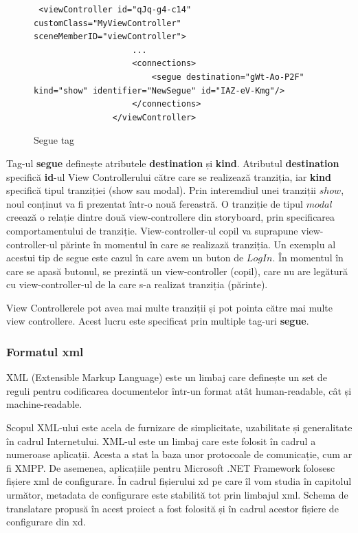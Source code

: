 \begin{figure}[!htbp]
\lstset{language=XML}
\begin{lstlisting}
 <viewController id="qJq-g4-c14" customClass="MyViewController" sceneMemberID="viewController">
                    ...
                    <connections>
                        <segue destination="gWt-Ao-P2F" kind="show" identifier="NewSegue" id="IAZ-eV-Kmg"/>
                    </connections>
                </viewController>
\end{lstlisting}
\caption{Segue tag}\label{fig:segueXML}
\end{figure}

Tag-ul \textbf{segue} definește atributele \textbf{destination} și \textbf{kind}. Atributul \textbf{destination} specifică \textbf{id}-ul View Controllerului către care se realizează tranziția, iar \textbf{kind} specifică tipul tranziției (show sau modal). Prin interemdiul unei tranziții $show$, noul conținut va fi prezentat într-o nouă fereastră. O tranziție de tipul $modal$ creează o relație dintre două view-controllere din storyboard, prin specificarea comportamentului de tranziție. View-controller-ul copil va suprapune view-controller-ul părinte în momentul în care se realizază tranziția. Un exemplu al acestui tip de segue este cazul în care avem un buton de $Log In$. În momentul în care se apasă butonul, se prezintă un view-controller (copil), care nu are legătură cu view-controller-ul de la care s-a realizat tranziția (părinte). 

View Controllerele pot avea mai multe tranziții și pot pointa către mai multe view controllere. Acest lucru este specificat prin multiple tag-uri \textbf{segue}.

\subsubsection{Formatul xml}

XML (Extensible Markup Language) este un limbaj care definește un set de reguli pentru codificarea documentelor într-un format atât human-readable, cât și machine-readable. 

Scopul XML-ului este acela de furnizare de simplicitate, uzabilitate și generalitate în cadrul Internetului. XML-ul este un limbaj care este folosit în cadrul a numeroase aplicații. Acesta a stat la baza unor protocoale de comunicație, cum ar fi XMPP. De asemenea, aplicațiile pentru Microsoft .NET Framework folosesc fișiere xml de configurare. 
În cadrul fișierului xd pe care îl vom studia în capitolul următor, metadata de configurare este stabilită tot prin limbajul xml. Schema de translatare propusă în acest proiect a fost folosită și în cadrul acestor fișiere de configurare din xd.

